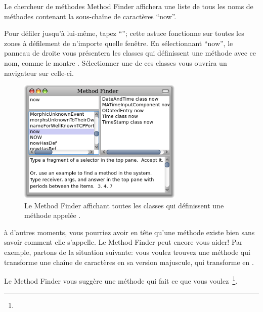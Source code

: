 \documentclass[a4paper,10pt,twoside]{book}
\begin{document}
Le chercheur de méthodes Method Finder affichera une liste de tous
les noms de méthodes contenant la sous-chaîne de caractères ``now''.  

Pour défiler jusqu'à  lui-même, tapez ``''; cette
astuce fonctionne sur toutes les zones à défilement de n'importe
quelle fenêtre. En sélectionnant ``now'', le panneau de droite
vous présentera les classes qui définissent une méthode
avec ce nom, comme le montre .
Sélectionner une de ces classes vous ouvrira un navigateur sur
celle-ci.

\begin{figure}[hbt]
\centerline {\includegraphics[width=0.7\textwidth]{methodFinder-now}}
\caption{Le Method Finder affichant toutes les classes qui
  définissent une méthode appelée .
}
\end{figure}

à d'autres moments, vous pourriez avoir en tête qu'une méthode
existe bien sans savoir comment elle s'appelle.
Le Method Finder peut encore vous aider! Par exemple, partons de la
situation suivante: vous voulez trouvez une méthode qui transforme
une chaîne de caractères en sa version majuscule, \cad qui
transforme  en .

\noindent
Le Method Finder vous suggère une méthode qui fait ce
que vous voulez~\footnote{}.
\end{document}

